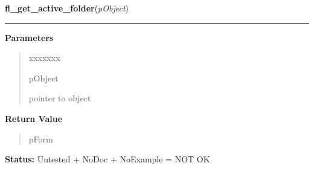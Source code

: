 \hspace{.8\funcindent}\begin{boxedminipage}{\funcwidth}

    \raggedright \textbf{fl\_get\_active\_folder}(\textit{pObject})

    \vspace{-1.5ex}

    \rule{\textwidth}{0.5\fboxrule}
\setlength{\parskip}{2ex}
\setlength{\parskip}{1ex}
      \textbf{Parameters}
      \vspace{-1ex}

      \begin{quote}
        \begin{Ventry}{xxxxxxx}

          \item[pObject]

          pointer to object

        \end{Ventry}

      \end{quote}

      \textbf{Return Value}
    \vspace{-1ex}

      \begin{quote}
      pForm

      \end{quote}

\textbf{Status:} Untested + NoDoc + NoExample = NOT OK



    \end{boxedminipage}

    \label{xformslib:library:fl_get_active_folder_number}

    \vspace{0.5ex}

